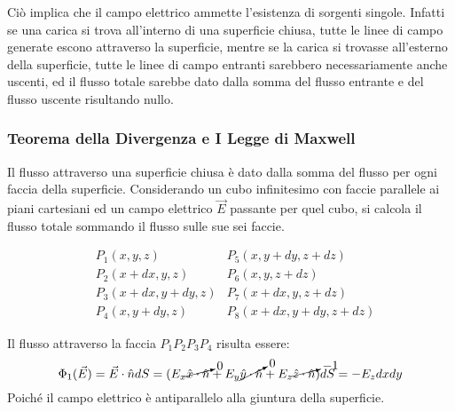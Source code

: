 \documentclass{article}
\numberwithin{equation}{subsection}
\begin{document}
Ciò implica che il campo elettrico ammette l'esistenza di sorgenti singole. Infatti se una carica si trova all'interno di una superficie chiusa, tutte le linee di campo generate 
escono attraverso la superficie, mentre se la carica si trovasse all'esterno della superficie, tutte le linee di campo entranti sarebbero necessariamente anche uscenti, ed il 
flusso totale sarebbe dato dalla somma del flusso entrante e del flusso uscente risultando nullo. 

\subsubsection{Teorema della Divergenza e I Legge di Maxwell}

Il flusso attraverso una superficie chiusa è dato dalla somma del flusso per ogni faccia della superficie. Considerando un cubo infinitesimo con faccie parallele ai piani 
cartesiani ed un campo elettrico $\vec{E}$ passante per quel cubo, si calcola il flusso totale sommando il flusso sulle sue sei faccie. 
\begin{center}
\end{center}
\begin{align*}
    &P_1(x,y,z) &P_5(x,y+dy,z+dz)\\
    &P_2(x+dx,y,z) &P_6(x,y,z+dz)\\
    &P_3(x+dx,y+dy,z) &P_7(x+dx,y,z+dz)\\
    &P_4(x,y+dy,z) &P_8(x+dx,y+dy,z+dz)
\end{align*}

Il flusso attraverso la faccia $P_1P_2P_3P_4$ risulta essere:
\begin{equation*}
    \Phi_1(\vec{E})=\vec{E}\cdot\hat{n}dS=(E_x\cancelto{0}{\hat{x}\cdot\hat{n}}+E_y\cancelto{0}{\hat{y}\cdot\hat{n}}+E_z\cancelto{-1}{\hat{z}\cdot\hat{n}})dS=-E_zdxdy
\end{equation*}
Poiché il campo elettrico è antiparallelo alla giuntura della superficie. 
\end{document}
